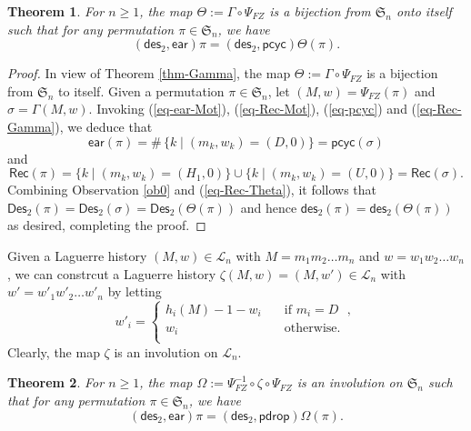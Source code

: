 \documentclass[12pt]{article}
\numberwithin{equation}{section}
\theoremstyle{plain}
\newtheorem{theorem}{Theorem}[section]
\def\Rec{\mathsf{Rec}}
\def\des{\mathsf{des}}
\def\ear{\mathsf{ear}}
\def\pcyc{\mathsf{pcyc}}
\def\pdrop{\mathsf{pdrop}}
\def\Des{\mathsf{Des}}
\begin{document}
    	  \begin{theorem}\label{thm-Theta}
    	 	For $n\geq 1$, the map $\Theta:=\Gamma\circ \Psi_{FZ}$ is a bijection from  $\mathfrak{S}_n$   onto  itself such that for any permutation  $\pi\in \mathfrak{S}_n$, we have  
    	 	$$
    	 	(\des_2, \ear)\pi= (\des_2, \pcyc)\Theta(\pi).
    	 	$$
    	 \end{theorem}
    	 \begin{proof}
    	 	In view of Theorem \ref{thm-Gamma}, the map $\Theta:=\Gamma\circ \Psi_{FZ}$ is  a bijection from  $\mathfrak{S}_n$ to itself. 
    	 	Given a permutation $\pi\in \mathfrak{S}_n$, let $(M,w)=\Psi_{FZ}(\pi)$ and $\sigma=\Gamma(M,w)$. 
    	 	 Invoking (\ref{eq-ear-Mot}), (\ref{eq-Rec-Mot}), (\ref{eq-pcyc}) and (\ref{eq-Rec-Gamma}), we deduce that
    	 	$$
    	 	\ear(\pi)=\#\, \{k\mid (m_k, w_k)=(D, 0)\}=\pcyc(\sigma)
    	 	$$
    	 	and 
    	 	\begin{equation}\label{eq-Rec-Theta}
    	 	\Rec(\pi)=\{k\mid (m_k, w_k)=(H_1, 0)\} \cup\{k\mid (m_k, w_k)=(U, 0)\}=\Rec(\sigma).
    	 	\end{equation}
    Combining Observation \ref{ob0} and (\ref{eq-Rec-Theta}), it follows that
    $\Des_2(\pi)=\Des_2(\sigma)=\Des_2(\Theta(\pi))$ and hence $\des_2(\pi)=\des_2(\Theta(\pi))$ as desired, completing the proof.
    	 	\end{proof}
    	 	
    	 	 Given a  Laguerre history  $(M,w)\in \mathcal{L}_n$ with $M=m_1m_2\ldots m_n$ and $w=w_1w_2\ldots w_n$, we can constrcut a Laguerre history  $\zeta(M,w)=(M,w')\in \mathcal{L}_n$  with $w'=w'_1w'_2\ldots w'_n$ by letting
    	 	$$
    	 	w'_i=	\begin{cases}
    	 		h_i(M)-1-w_i&\quad \text{if $m_i=D$ },\\
    	 		w_i&\quad \text{otherwise}.\\ 
    	 	\end{cases}
    	 	$$
    	 	Clearly, the map $\zeta$ is an involution on $\mathcal{L}_n$.   
    	 	
    	 	
    	 	  \begin{theorem}\label{thm-Omega}
    	 		For $n\geq 1$, the map $\Omega:= \Psi^{-1}_{FZ}\circ\zeta\circ \Psi_{FZ}$ is an involution on  $\mathfrak{S}_n$ such that for any permutation  $\pi\in \mathfrak{S}_n$, we have  
    	 		$$
    	 		(\des_2, \ear)\pi= (\des_2, \pdrop)\Omega(\pi).
    	 		$$
    	 	\end{theorem}
    	 	
\end{document}
